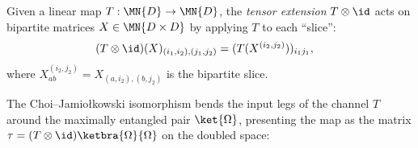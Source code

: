 \begin{definition}\label{def:tensor_map_id}
    \leanok
    Given a linear map $T : \MN{D} \to \MN{D}$,
    the \emph{tensor extension} $T \otimes \id$ acts on bipartite matrices
    $X \in \MN{D \times D}$ by applying $T$ to each ``slice'':
    \begin{align}
        (T \otimes \id)(X)_{(i_1,i_2),(j_1,j_2)}
        &= (T(X^{(i_2,j_2)}))_{i_1 j_1},
        \label{eq:representations_tensor_map_id}
    \end{align}
    where $X^{(i_2,j_2)}_{ab} = X_{(a,i_2),(b,j_2)}$ is the
    bipartite slice.
\end{definition}


The Choi--Jamio\l{}kowski isomorphism bends the input legs of the channel $T$
around the maximally entangled pair $\ket{\Omega}$, presenting the map as the
matrix $\tau=(T\otimes\id)\ketbra{\Omega}{\Omega}$ on the doubled space:
\begin{center}
    \tenkzkernel
    \begin{tenkz}[rows={wire,wire}, cols=2, west=open, east=cup]
        \tn[skin=ring, at=on cup-1-2 0.5]{\ketbra{\Omega}{\Omega}}
    \end{tenkz}
\end{center}


